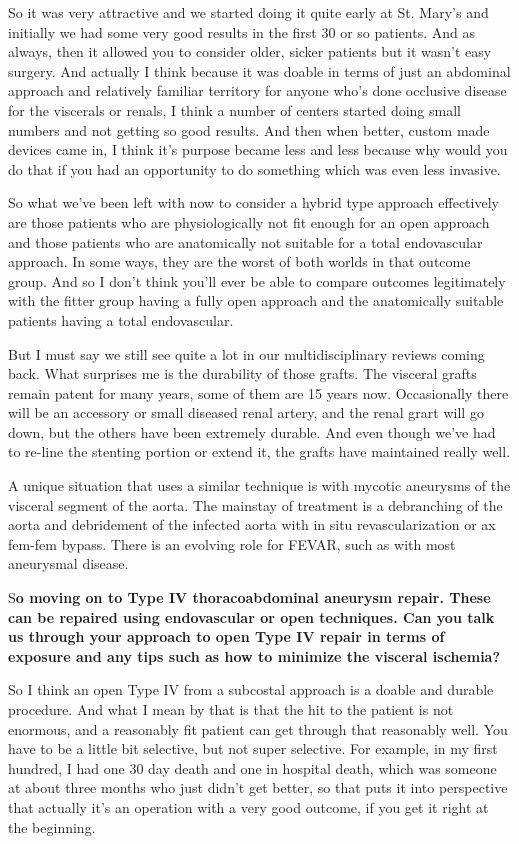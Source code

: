 \documentclass[
]{book}
\begin{document}
So it was very attractive and we started doing it quite early at St.
Mary's and initially we had some very good results in the first 30 or so
patients. And as always, then it allowed you to consider older, sicker
patients but it wasn't easy surgery. And actually I think because it was
doable in terms of just an abdominal approach and relatively familiar
territory for anyone who's done occlusive disease for the viscerals or
renals, I think a number of centers started doing small numbers and not
getting so good results. And then when better, custom made devices came
in, I think it's purpose became less and less because why would you do
that if you had an opportunity to do something which was even less
invasive.

So what we've been left with now to consider a hybrid type approach
effectively are those patients who are physiologically not fit enough
for an open approach and those patients who are anatomically not
suitable for a total endovascular approach. In some ways, they are the
worst of both worlds in that outcome group. And so I don't think you'll
ever be able to compare outcomes legitimately with the fitter group
having a fully open approach and the anatomically suitable patients
having a total endovascular.

But I must say we still see quite a lot in our multidisciplinary reviews
coming back. What surprises me is the durability of those grafts. The
visceral grafts remain patent for many years, some of them are 15 years
now. Occasionally there will be an accessory or small diseased renal
artery, and the renal grart will go down, but the others have been
extremely durable. And even though we've had to re-line the stenting
portion or extend it, the grafts have maintained really well.

A unique situation that uses a similar technique is with mycotic
aneurysms of the visceral segment of the aorta. The mainstay of
treatment is a debranching of the aorta and debridement of the infected
aorta with in situ revascularization or ax fem-fem bypass. There is an
evolving role for FEVAR, such as with most aneurysmal
disease.\citep{sörelius2016, sule2016}

S\textbf{o moving on to Type IV thoracoabdominal aneurysm repair. These can be
repaired using endovascular or open techniques. Can you talk us through
your approach to open Type IV repair in terms of exposure and any tips
such as how to minimize the visceral ischemia?}

So I think an open Type IV from a subcostal approach is a doable and
durable procedure. And what I mean by that is that the hit to the
patient is not enormous, and a reasonably fit patient can get through
that reasonably well. You have to be a little bit selective, but not
super selective. For example, in my first hundred, I had one 30 day
death and one in hospital death, which was someone at about three months
who just didn't get better, so that puts it into perspective that
actually it's an operation with a very good outcome, if you get it right
at the beginning.
\end{document}
